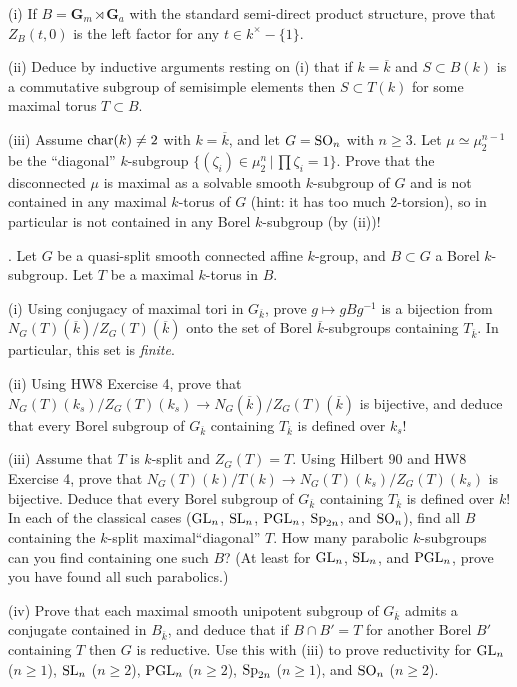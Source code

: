 \documentclass[10pt]{amsart}
\begin{document}
(i) If $B = \mathbf{G}_m \rtimes \mathbf{G}_a$ with the standard semi-direct product
structure, prove that $Z_B(t,0)$ is the left factor for any $t \in k^{\times} - \{1\}$. 

(ii) Deduce by inductive arguments resting on (i) that if $k = \overline{k}$
and $S \subset B(k)$ is a commutative subgroup of semisimple
elements then $S \subset T(k)$ for some maximal torus $T \subset B$.

(iii) Assume ${\rm{char}}(k) \ne 2$ with $k = \overline{k}$, and let $G = {\rm{SO}}_n$ with $n \ge 3$. 
Let $\mu \simeq \mu_2^{n-1}$ be the ``diagonal'' $k$-subgroup 
$\{(\zeta_i) \in \mu_2^n\,|\,\prod \zeta_i = 1\}$. Prove that the disconnected $\mu$ is
maximal as a solvable smooth $k$-subgroup of $G$ and is not contained in
any maximal $k$-torus of $G$ (hint:  it has too much 2-torsion), so in particular is not 
contained in any
Borel $k$-subgroup (by (ii))!

\medskip{}. Let $G$ be a quasi-split smooth connected affine $k$-group, and $B \subset G$ a Borel $k$-subgroup.  Let 
$T$ be a maximal $k$-torus in $B$.  

(i) Using conjugacy of maximal tori in $G_{\overline{k}}$, prove $g \mapsto gBg^{-1}$ is a bijection from
$N_G(T)(\overline{k})/Z_G(T)(\overline{k})$ onto the set of Borel $\overline{k}$-subgroups containing $T_{\overline{k}}$.
In particular, this set is {\em finite}.  

(ii) Using HW8 Exercise 4, prove that $N_G(T)(k_s)/Z_G(T)(k_s)
\rightarrow N_G(\overline{k})/Z_G(T)(\overline{k})$ is bijective, and deduce that every Borel subgroup of
$G_{\overline{k}}$ containing $T_{\overline{k}}$ is defined over $k_s$!

(iii) Assume that $T$ is $k$-split and $Z_G(T) = T$. Using Hilbert 90 and HW8 Exercise 4, prove that
$N_G(T)(k)/T(k) \rightarrow N_G(T)(k_s)/Z_G(T)(k_s)$ is bijective.  Deduce that 
every Borel subgroup of $G_{\overline{k}}$ containing $T_{\overline{k}}$ is defined over $k$!
In each of the classical cases
(${\rm{GL}}_n$, ${\rm{SL}}_n$, ${\rm{PGL}}_n$, ${\rm{Sp}}_{2n}$, and ${\rm{SO}}_n$),
find all $B$ containing the $k$-split maximal``diagonal'' $T$.  How many parabolic $k$-subgroups
can you find containing one such $B$?  (At least for ${\rm{GL}}_n$, ${\rm{SL}}_n$,
and ${\rm{PGL}}_n$, prove you have found all such parabolics.)

(iv) Prove that each maximal smooth unipotent subgroup of $G_{\overline{k}}$ admits a conjugate
contained in $B_{\overline{k}}$, and deduce that if $B \cap B' = T$ for another Borel $B'$ containing $T$
then $G$ is reductive.  Use this with (iii) to prove reductivity for
${\rm{GL}}_n$ ($n \ge 1$), ${\rm{SL}}_n$ ($n \ge 2$), ${\rm{PGL}}_n$ ($n \ge 2$), ${\rm{Sp}}_{2n}$ ($n \ge 1$), and
${\rm{SO}}_n$ ($n \ge 2$). 
\end{document}
